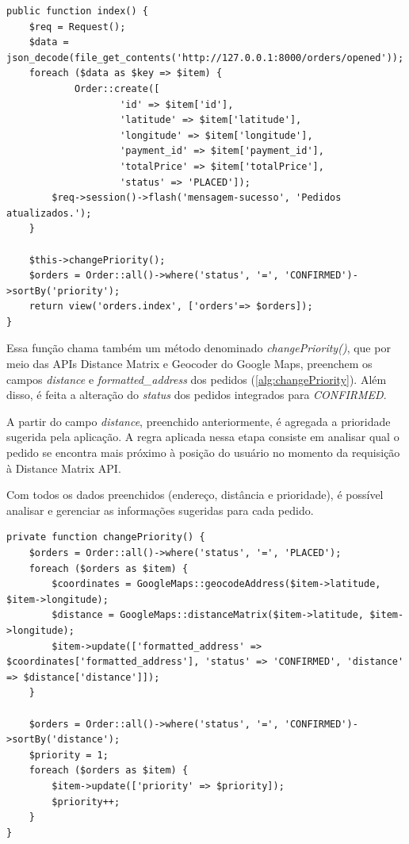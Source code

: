 \begin{lstlisting}[caption={Delivery Routes - Função integradora de pedidos}, style=htmlcssjs, label=alg:orderIndex]
public function index() {
    $req = Request();
    $data = json_decode(file_get_contents('http://127.0.0.1:8000/orders/opened'));
    foreach ($data as $key => $item) {
            Order::create([
                    'id' => $item['id'],
                    'latitude' => $item['latitude'],
                    'longitude' => $item['longitude'],
                    'payment_id' => $item['payment_id'],
                    'totalPrice' => $item['totalPrice'],
                    'status' => 'PLACED']);
        $req->session()->flash('mensagem-sucesso', 'Pedidos atualizados.');
    }

    $this->changePriority();
    $orders = Order::all()->where('status', '=', 'CONFIRMED')->sortBy('priority');
    return view('orders.index', ['orders'=> $orders]);
}
\end{lstlisting}

Essa função chama também um método denominado \textit{changePriority()}, que por meio das APIs Distance Matrix e Geocoder do Google Maps, preenchem os campos \textit{distance} e \textit{formatted\_address} dos pedidos (\autoref{alg:changePriority}). Além disso, é feita a alteração do \textit{status} dos pedidos integrados para \textit{CONFIRMED}.

A partir do campo \textit{distance}, preenchido anteriormente, é agregada a prioridade sugerida pela aplicação. A regra aplicada nessa etapa consiste em analisar qual o pedido se encontra mais próximo à posição do usuário no momento da requisição à Distance Matrix API.

Com todos os dados preenchidos (endereço, distância e prioridade), é possível analisar e gerenciar as informações sugeridas para cada pedido.

\newpage
\begin{lstlisting}[caption={Delivery Routes - Função de troca de prioridade dos pedidos}, style=htmlcssjs, label=alg:changePriority]
 private function changePriority() {
    $orders = Order::all()->where('status', '=', 'PLACED');
    foreach ($orders as $item) {
        $coordinates = GoogleMaps::geocodeAddress($item->latitude, $item->longitude);
        $distance = GoogleMaps::distanceMatrix($item->latitude, $item->longitude);
        $item->update(['formatted_address' => $coordinates['formatted_address'], 'status' => 'CONFIRMED', 'distance' => $distance['distance']]);
    }

    $orders = Order::all()->where('status', '=', 'CONFIRMED')->sortBy('distance');
    $priority = 1;
    foreach ($orders as $item) {
        $item->update(['priority' => $priority]);
        $priority++;
    }
}
\end{lstlisting}